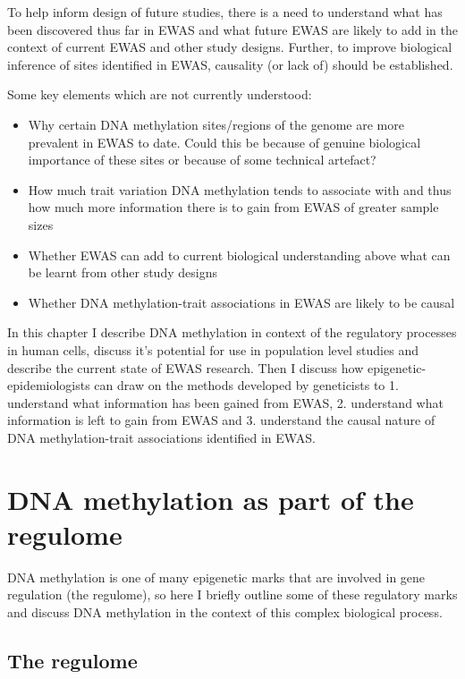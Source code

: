 \documentclass[11pt,twoside]{bristolthesis}
\providecommand{\tightlist}{%
  \setlength{\itemsep}{0pt}\setlength{\parskip}{0pt}}
\begin{document}
To help inform design of future studies, there is a need to understand what has been discovered thus far in EWAS and what future EWAS are likely to add in the context of current EWAS and other study designs. Further, to improve biological inference of sites identified in EWAS, causality (or lack of) should be established.

Some key elements which are not currently understood:
\begin{itemize}
\tightlist
\item
  Why certain DNA methylation sites/regions of the genome are more prevalent in EWAS to date. Could this be because of genuine biological importance of these sites or because of some technical artefact?
\item
  How much trait variation DNA methylation tends to associate with and thus how much more information there is to gain from EWAS of greater sample sizes
\item
  Whether EWAS can add to current biological understanding above what can be learnt from other study designs
\item
  Whether DNA methylation-trait associations in EWAS are likely to be causal
\end{itemize}
In this chapter I describe DNA methylation in context of the regulatory processes in human cells, discuss it's potential for use in population level studies and describe the current state of EWAS research. Then I discuss how epigenetic-epidemiologists can draw on the methods developed by geneticists to 1. understand what information has been gained from EWAS, 2. understand what information is left to gain from EWAS and 3. understand the causal nature of DNA methylation-trait associations identified in EWAS.

\hypertarget{dna-methylation-as-part-of-the-regulome}{%
\section{DNA methylation as part of the regulome}\label{dna-methylation-as-part-of-the-regulome}}

DNA methylation is one of many epigenetic marks that are involved in gene regulation (the regulome), so here I briefly outline some of these regulatory marks and discuss DNA methylation in the context of this complex biological process.

\hypertarget{the-regulome}{%
\subsection{The regulome}\label{the-regulome}}
\end{document}
